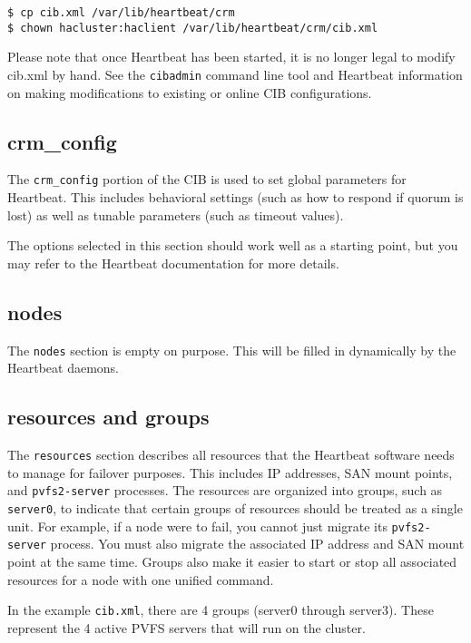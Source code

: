 \documentclass[11pt]{article}
\begin{document}
\begin{verbatim}
$ cp cib.xml /var/lib/heartbeat/crm
$ chown hacluster:haclient /var/lib/heartbeat/crm/cib.xml
\end{verbatim}

Please note that once Heartbeat has been started, it is no longer
legal to modify cib.xml by hand.  See the \texttt{cibadmin} command line
tool and Heartbeat information on making modifications to
existing or online CIB configurations.

\subsection{crm\_config}

The \texttt{crm\_config} portion of the CIB is used to set global
parameters for Heartbeat.  This includes behavioral settings
(such as how to respond if quorum is lost) as well as tunable parameters
(such as timeout values).

The options selected in this section should work well as a starting
point, but you may refer to the Heartbeat documentation for more
details.

\subsection{nodes}

The \texttt{nodes} section is empty on purpose.  This will be filled in
dynamically by the Heartbeat daemons.

\subsection{resources and groups}

The \texttt{resources} section describes all resources that the
Heartbeat software needs to manage for failover purposes.  This includes
IP addresses, SAN mount points, and \texttt{pvfs2-server} processes.  The
resources are organized into groups, such as \texttt{server0}, to
indicate that certain groups of resources should be treated as a single
unit.  For example, if a node were to fail, you cannot just migrate its
\texttt{pvfs2-server} process.  You must also migrate the associated IP address
and SAN mount point at the same time.  Groups also make it easier to
start or stop all associated resources for a node with one unified command.

In the example \texttt{cib.xml}, there are 4 groups (server0 through
server3).  These represent the 4 active PVFS servers that will run on
the cluster.
\end{document}
